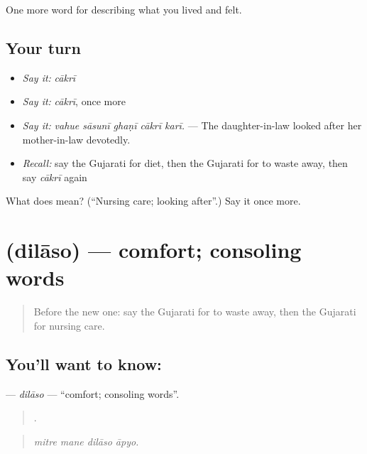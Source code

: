 \begin{grammarlens}[title={What you've built}]
One more word for describing what you lived and felt.
\end{grammarlens}

\subsection*{Your turn}
\begin{itemize}
\raggedright
  \item \emph{Say it:} \emph{cākrī}
  \item \emph{Say it:} \emph{cākrī}, once more
  \item \emph{Say it:} \emph{vahue sāsunī ghaṇī cākrī karī.} — The daughter-in-law looked after her mother-in-law devotedly.
  \item \emph{Recall:} say the Gujarati for diet, then the Gujarati for to waste away, then say \emph{cākrī} again
\end{itemize}

\begin{tcolorbox}[breakable,colback=teal!4,colframe=teal!35!black,title={Before you move on}]
What does  mean? (\textquotedblleft{}Nursing care; looking after\textquotedblright{}.) Say it once more.
\end{tcolorbox}
\section[\texorpdfstring{\gu{દિલાસો} (dilāso)}{દિલાસો (dilāso)}]{ (dilāso) — comfort; consoling words}

\label{lesson:GU-C487-dilaso}



\begin{quote}
Before the new one: say the Gujarati for to waste away, then the Gujarati for nursing care.
\end{quote}

\subsection*{You'll want to know: }
\textbf{} — \emph{dilāso} — \textquotedblleft{}comfort; consoling words\textquotedblright{}.

\begin{quote}
   .
\end{quote}

\begin{quote}
\emph{mitre mane dilāso āpyo.}
\end{quote}

